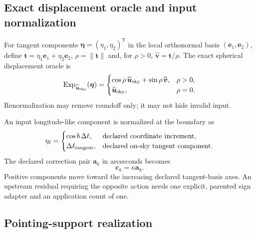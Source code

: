 \subsection{Exact displacement oracle and input normalization}

For tangent components
$\boldsymbol\eta=(\eta_1,\eta_2)^\mathsf T$ in the local orthonormal basis
$(\boldsymbol e_1,\boldsymbol e_2)$, define
$\boldsymbol t=\eta_1\boldsymbol e_1+\eta_2\boldsymbol e_2$,
$\rho=\lVert\boldsymbol t\rVert$ and, for $\rho>0$,
$\widehat{\boldsymbol v}=\boldsymbol t/\rho$.  The exact spherical displacement oracle is
\begin{equation}
 \operatorname{Exp}_{\widehat{\boldsymbol u}_{\rm sky}}(\boldsymbol\eta)=
 \begin{cases}
  \cos\rho\,\widehat{\boldsymbol u}_{\rm sky}
   +\sin\rho\,\widehat{\boldsymbol v},&\rho>0,\\
  \widehat{\boldsymbol u}_{\rm sky},&\rho=0.
 \end{cases}
 \label{eq:exp}
\end{equation}
Renormalization may remove roundoff only; it may not hide invalid input.

An input longitude-like component is normalized at the boundary as
\begin{equation}
 \eta_\ell=
 \begin{cases}
  \cos b\,\Delta\ell,&\text{declared coordinate increment},\\
  \Delta\ell_{\rm tangent},&\text{declared on-sky tangent component}.
 \end{cases}
 \label{eq:longitude-normalization}
\end{equation}
The declared correction pair $\boldsymbol a_k$ in arcseconds becomes
\begin{equation}
 \boldsymbol c_k=\kappa\boldsymbol a_k.
 \label{eq:correction-unit}
\end{equation}
Positive components move toward the increasing declared tangent-basis axes.
An upstream residual requiring the opposite action needs one explicit,
parented sign adapter and an application count of one.

\subsection{Pointing-support realization}

